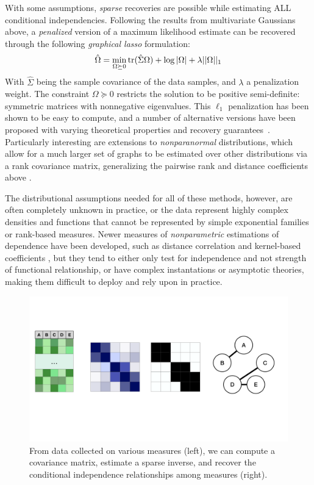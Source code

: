 With some assumptions, \textit{sparse} recoveries are possible while estimating ALL conditional independencies. Following the results from multivariate Gaussians above,
a \textit{penalized} version of a maximum likelihood estimate can be recovered through the following \textit{graphical lasso} \citep{friedman2008sparse} formulation:
\begin{align}\label{eq:glasso}
    \hat{\Omega} = \min_{\Omega \succeq 0} \operatorname{tr}(\hat{\Sigma}\Omega) + \log|\Omega| + \lambda||\Omega||_1
\end{align}
With $\hat{\Sigma}$ being the sample covariance of the data samples, and $\lambda$ a penalization weight. The constraint $\Omega \succeq 0$ restricts the solution to be positive semi-definite: symmetric matrices with nonnegative eigenvalues. This $\ell_1$ penalization has been shown to be easy to compute, and a number of alternative versions have been proposed with varying theoretical properties and recovery guarantees~\citep{cai2011constrained,yuan2010high}.
Particularly interesting are extensions to \textit{nonparanormal} distributions, which allow for a much larger set of graphs to be estimated over other distributions via a rank covariance matrix, generalizing the pairwise rank and distance coefficients above \citep{liu2009nonparanormal,xue2012regularized}.

The distributional assumptions needed for all of these methods, however, are often completely unknown in practice, or the data represent highly complex densities and functions that cannot be represented by simple exponential families or rank-based measures.
Newer measures of \textit{nonparametric} estimations of dependence have been developed, such as distance correlation and kernel-based coefficients \citep{szekely2014partial,wang2015conditional,doran2014permutation}, but they tend to either only test for independence and not strength of functional relationship, or have complex instantations or asymptotic theories, making them difficult to deploy and rely upon in practice.
\begin{figure}
	\includegraphics[width=\textwidth,trim={0 10cm 0 5cm},clip]{2_bknd/graphest.pdf}
	\caption[Graph Estimation from Data]{From data collected on various measures (left), we can compute a covariance matrix, estimate a sparse inverse, and recover the conditional independence relationships among measures (right).}
	\label{fig:graphest}
\end{figure}



